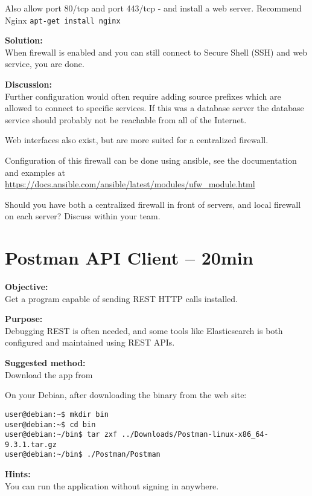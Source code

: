 \documentclass[a4paper,11pt,notitlepage]{report}
\begin{document}
Also allow port 80/tcp and port 443/tcp - and install a web server. Recommend Nginx \verb+apt-get install nginx+

{\bf Solution:}\\
When firewall is enabled and you can still connect to Secure Shell (SSH) and web service, you are done.

{\bf Discussion:}\\
Further configuration would often require adding source prefixes which are allowed to connect to specific services. If this was a database server the database service should probably not be reachable from all of the Internet.

Web interfaces also exist, but are more suited for a centralized firewall.

Configuration of this firewall can be done using ansible, see the documentation and examples at \url{https://docs.ansible.com/ansible/latest/modules/ufw_module.html}

Should you have both a centralized firewall in front of servers, and local firewall on each server? Discuss within your team.




\chapter{Postman API Client -- 20min}
\label{ex:postman-api}


{\bf Objective:}\\
Get a program capable of sending REST HTTP calls installed.

{\bf Purpose:}\\
Debugging REST is often needed, and some tools like Elasticsearch is both configured and maintained using REST APIs.

{\bf Suggested method:}\\
Download the app from 

On your Debian, after downloading the binary from the web site:
\begin{verbatim}
user@debian:~$ mkdir bin
user@debian:~$ cd bin
user@debian:~/bin$ tar zxf ../Downloads/Postman-linux-x86_64-9.3.1.tar.gz
user@debian:~/bin$ ./Postman/Postman
\end{verbatim}

{\bf Hints:}\\
You can run the application without signing in anywhere.
\end{document}
